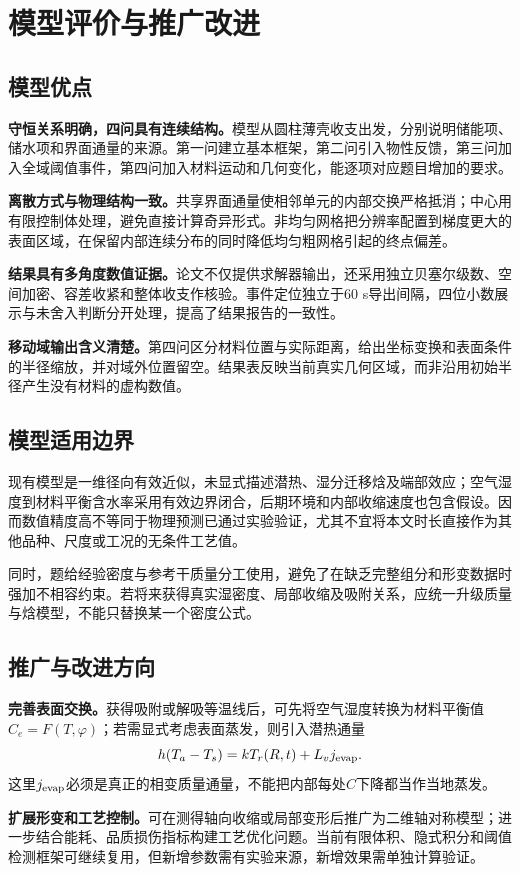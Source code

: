 \section{模型评价与推广改进}
\subsection{模型优点}
\textbf{守恒关系明确，四问具有连续结构。}模型从圆柱薄壳收支出发，分别说明储能项、储水项和界面通量的来源。第一问建立基本框架，第二问引入物性反馈，第三问加入全域阈值事件，第四问加入材料运动和几何变化，能逐项对应题目增加的要求。

\textbf{离散方式与物理结构一致。}共享界面通量使相邻单元的内部交换严格抵消；中心用有限控制体处理，避免直接计算奇异形式。非均匀网格把分辨率配置到梯度更大的表面区域，在保留内部连续分布的同时降低均匀粗网格引起的终点偏差。

\textbf{结果具有多角度数值证据。}论文不仅提供求解器输出，还采用独立贝塞尔级数、空间加密、容差收紧和整体收支作核验。事件定位独立于60 s导出间隔，四位小数展示与未舍入判断分开处理，提高了结果报告的一致性。

\textbf{移动域输出含义清楚。}第四问区分材料位置与实际距离，给出坐标变换和表面条件的半径缩放，并对域外位置留空。结果表反映当前真实几何区域，而非沿用初始半径产生没有材料的虚构数值。

\subsection{模型适用边界}
现有模型是一维径向有效近似，未显式描述潜热、湿分迁移焓及端部效应；空气湿度到材料平衡含水率采用有效边界闭合，后期环境和内部收缩速度也包含假设。因而数值精度高不等同于物理预测已通过实验验证，尤其不宜将本文时长直接作为其他品种、尺度或工况的无条件工艺值。

同时，题给经验密度与参考干质量分工使用，避免了在缺乏完整组分和形变数据时强加不相容约束。若将来获得真实湿密度、局部收缩及吸附关系，应统一升级质量与焓模型，不能只替换某一个密度公式。

\subsection{推广与改进方向}
\textbf{完善表面交换。}获得吸附或解吸等温线后，可先将空气湿度转换为材料平衡值$C_e=F(T,\varphi)$；若需显式考虑表面蒸发，则引入潜热通量
\begin{equation}
h(T_a-T_s)=kT_r(R,t)+L_vj_{\rm evap}.
\end{equation}
这里$j_{\rm evap}$必须是真正的相变质量通量，不能把内部每处$C$下降都当作当地蒸发。

\textbf{扩展形变和工艺控制。}可在测得轴向收缩或局部变形后推广为二维轴对称模型；进一步结合能耗、品质损伤指标构建工艺优化问题。当前有限体积、隐式积分和阈值检测框架可继续复用，但新增参数需有实验来源，新增效果需单独计算验证。
